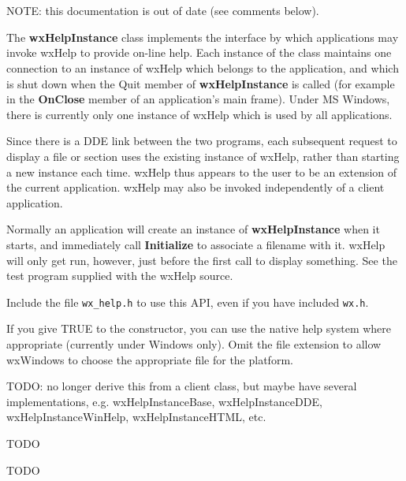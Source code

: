 \section{}\label{wxhelpinstance}

NOTE: this documentation is out of date (see comments below).

The {\bf wxHelpInstance} class implements the interface by which
applications may invoke wxHelp to provide on-line help. Each instance
of the class maintains one connection to an instance of wxHelp which
belongs to the application, and which is shut down when the Quit
member of {\bf wxHelpInstance} is called (for example in the {\bf
OnClose} member of an application's main frame). Under MS Windows,
there is currently only one instance of wxHelp which is used by all
applications.

Since there is a DDE link between the two programs, each subsequent
request to display a file or section uses the existing instance of
wxHelp, rather than starting a new instance each time. wxHelp thus
appears to the user to be an extension of the current application.
wxHelp may also be invoked independently of a client application.

Normally an application will create an instance of {\bf
wxHelpInstance} when it starts, and immediately call {\bf Initialize}\rtfsp
to associate a filename with it. wxHelp will only get run, however,
just before the first call to display something. See the test program
supplied with the wxHelp source.

Include the file {\tt wx\_help.h} to use this API, even if you have
included {\tt wx.h}.

If you give TRUE to the constructor, you can use the native help system
where appropriate (currently under Windows only). Omit the file extension
to allow wxWindows to choose the appropriate file for the platform.

TODO: no longer derive this from a client class, but maybe have several implementations,
e.g. wxHelpInstanceBase, wxHelpInstanceDDE, wxHelpInstanceWinHelp, wxHelpInstanceHTML, etc.


TODO


TODO



